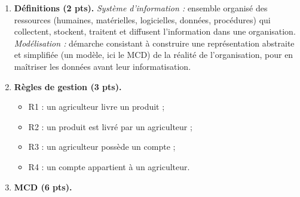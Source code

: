 \documentclass[11pt]{article}
\begin{document}
\begin{corrige}
\begin{enumerate}
  \item \textbf{Définitions (2 pts).} \emph{Système d'information :} ensemble organisé des ressources (humaines, matérielles, logicielles, données, procédures) qui collectent, stockent, traitent et diffusent l'information dans une organisation. \emph{Modélisation :} démarche consistant à construire une représentation abstraite et simplifiée (un modèle, ici le MCD) de la réalité de l'organisation, pour en maîtriser les données avant leur informatisation.
  \item \textbf{Règles de gestion (3 pts).}
  \begin{itemize}
    \item R1 : un agriculteur livre un produit ;
    \item R2 : un produit est livré par un agriculteur ;
    \item R3 : un agriculteur possède un compte ;
    \item R4 : un compte appartient à un agriculteur.
  \end{itemize}
  \item \textbf{MCD (6 pts).}
\begin{popfigure}
\end{popfigure}
\end{enumerate}
\end{corrige}
\end{document}
